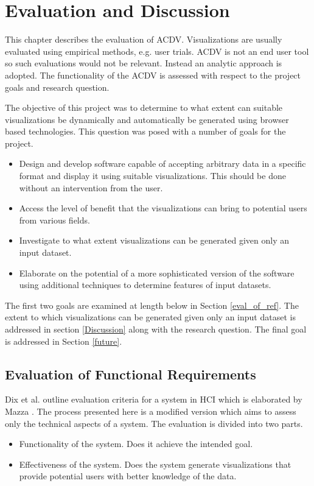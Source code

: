 \documentclass[a4paper, 11pt, titlepage, onehalfspacing]{report}
\begin{document}
\chapter{Evaluation and Discussion}
This chapter describes the evaluation of AC\lightning{}DV. Visualizations are usually evaluated using empirical methods, e.g. user trials. AC\lightning{}DV is not an end user tool so such evaluations would not be relevant. Instead an analytic approach is adopted. The functionality of the AC\lightning{}DV is assessed with respect to the project goals and research question.

The objective of this project was to determine to what extent can suitable visualizations be dynamically and automatically be generated using browser based technologies. This question was posed with a number of goals for the project. 


\begin{itemize}
\item Design and develop software capable of accepting arbitrary data in a specific format and display it using suitable visualizations. This should be done without an intervention from the user.
\item Access the level of benefit that the visualizations can bring to potential users from various fields.
\item Investigate to what extent visualizations can be generated given only an input dataset.
\item Elaborate on the potential of a more sophisticated version of the software using additional techniques to determine features of input datasets.
\end{itemize}

The first two goals are examined at length below in Section \ref{eval_of_ref}. The extent to which visualizations can be generated given only an input dataset is addressed in section \ref{Discussion} along with the research question. The final goal is addressed in Section \ref{future}.

\section{Evaluation of Functional Requirements}
\label{eval_of_req}
Dix et al. outline evaluation criteria for a system in HCI \cite{dix2004human} which is elaborated by Mazza \cite{mazza2009introduction}. The process presented here is a modified version which aims to assess only the technical aspects of a system. The evaluation is divided into two parts.
\begin{itemize}
\item Functionality of the system. Does it achieve the intended goal.
\item Effectiveness of the system. Does the system generate visualizations that provide potential users with better knowledge of the data.
\end{itemize}
\end{document}
